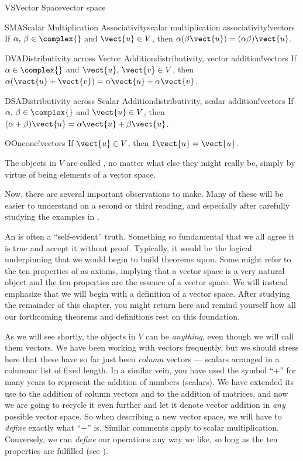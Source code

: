 \begin{definition}{VS}{Vector Space}{vector space}
\begin{propertylist}
%
\begin{property}{SMA}{Scalar Multiplication Associativity}{scalar multiplication associativity!vectors}
If $\alpha,\,\beta\in\complex{\null}$ and $\vect{u}\in V$, then $\alpha(\beta\vect{u})=(\alpha\beta)\vect{u}$.\end{property}
%
\begin{property}{DVA}{Distributivity across Vector Addition}{distributivity, vector addition!vectors}
If $\alpha\in\complex{\null}$ and $\vect{u},\,\vect{v}\in V$, then $\alpha(\vect{u}+\vect{v})=\alpha\vect{u}+\alpha\vect{v}$.\end{property}
%
\begin{property}{DSA}{Distributivity across Scalar Addition}{distributivity, scalar addition!vectors}
If $\alpha,\,\beta\in\complex{\null}$ and $\vect{u}\in V$, then
$(\alpha+\beta)\vect{u}=\alpha\vect{u}+\beta\vect{u}$.\end{property}
%
\begin{property}{O}{One}{one!vectors}
If $\vect{u}\in V$, then $1\vect{u}=\vect{u}$.\end{property}
%
\end{propertylist}
%
The objects in $V$ are called , no matter what else they might really be, simply by virtue of being elements of a vector space.
\end{definition}
%
Now, there are several important observations to make.  Many of these will be easier to understand on a second or third reading, and especially after carefully studying the examples in .\par
%
An  is often a ``self-evident'' truth.  Something so fundamental that we all agree it is true and accept it without proof.  Typically, it would be the logical underpinning that we would begin to build theorems upon.  Some might refer to the ten properties of  as axioms, implying that a vector space is a very natural object and the ten properties are the essence of a vector space.  We will instead emphasize that we will begin with a definition of a vector space.   After studying the remainder of this chapter, you might return here and remind yourself how all our forthcoming theorems and definitions rest on this foundation.\par
%
As we will see shortly, the objects in $V$ can be {\em anything}, even though we will call them vectors.  We have been working with vectors frequently, but we should stress here that these have so far just been {\em column} vectors --- scalars arranged in a columnar list of fixed length.  In a similar vein, you have used the symbol ``+'' for many years to represent the addition of numbers (scalars).  We have extended its use to the addition of column vectors and to the addition of matrices, and now we are going to recycle it even further and let it denote vector addition in {\em any} possible vector space.  So when describing a new vector space, we will have to {\em define} exactly what ``+'' is.  Similar comments apply to scalar multiplication.  Conversely, we can {\em define} our operations any way we like, so long as the ten properties are fulfilled (see ).\par
